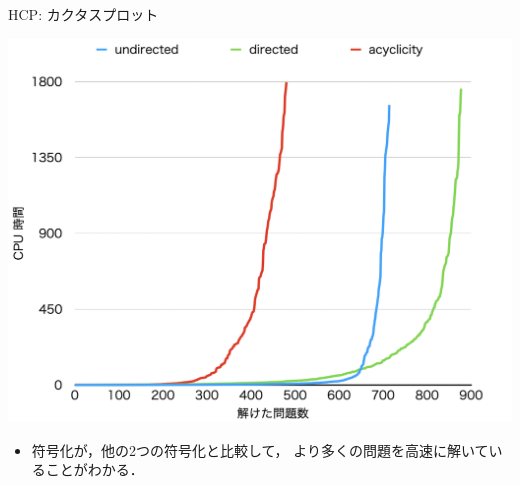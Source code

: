 \documentclass[dvipdfmx]{beamer}
\begin{document}
\begin{frame}{HCP: カクタスプロット}

\begin{center}
  \includegraphics[width=0.7\linewidth]{fig/cactus.png}
\end{center}

\begin{itemize}
\item {} 符号化が，他の2つの符号化と比較して，
  より多くの問題を高速に解いていることがわかる．
\end{itemize}
\end{frame}
\end{document}
